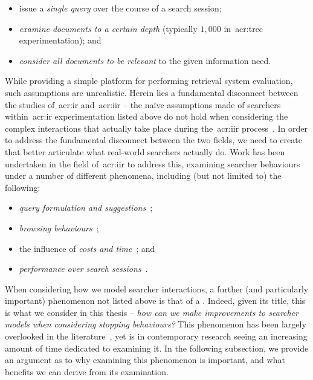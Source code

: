 \begin{itemize}
    \item{issue a \emph{single query} over the course of a search session;}
    \item{\emph{examine documents to a certain depth} (typically $1,000$ in~\gls{acr:trec} experimentation); and}
    \item{\emph{consider all documents to be relevant} to the given information need.}
\end{itemize}

While providing a simple platform for performing retrieval system evaluation, such assumptions are unrealistic. Herein lies a fundamental disconnect between the studies of~\gls{acr:ir} and~\gls{acr:iir} -- the na\"{i}ve assumptions made of searchers within~\gls{acr:ir} experimentation listed above do not hold when considering the complex interactions that actually take place during the~\gls{acr:iir} process~\citep{ingwersen2005theturn}. In order to address the fundamental disconnect between the two fields, we need to create  that better articulate what real-world searchers actually do. Work has been undertaken in the field of~\gls{acr:iir} to address this, examining searcher behaviours under a number of different phenomena, including (but not limited to) the following:

\begin{itemize}
    \item{\emph{query formulation and suggestions}~\citep{azzopardi2009query_side, azzopardi2007languages, baskaya2013behavioural_factors, carterette2015test_collections, jordan2006cqg, keskustalo2009querying, verberne2015personalised_queries};}
    \item{\emph{browsing behaviours}~\citep{carterette2015test_collections, chuklin2015click_models, guo2009click_chain, pakkonen2015behavioural_dimensions, smucker2011user_strategies};}
    \item{the influence of \emph{costs and time}~\citep{azzopardi2011economics, baskaya2013behavioural_factors}; and}
    \item{\emph{performance over search sessions}~\citep{luo2014winwin, luo2015pomdp}.}
\end{itemize}

When considering how we model searcher interactions, a further (and particularly important) phenomenon not listed above is that of a . Indeed, given its title, this is what we consider in this thesis -- \emph{how can we make improvements to searcher models when considering stopping behaviours?} This phenomenon has been largely overlooked in the literature~\citep{maxwell2015stopping_strategies}, yet is in contemporary research seeing an increasing amount of time dedicated to examining it. In the following subsection, we provide an argument as to why examining this phenomenon is important, and what benefits we can derive from its examination.

